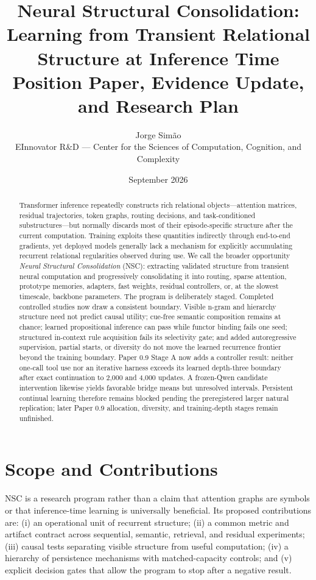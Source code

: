 \documentclass[11pt]{article}
\title{Neural Structural Consolidation:\\Learning from Transient Relational Structure at Inference Time\\\large Position Paper, Evidence Update, and Research Plan}
\author{Jorge Sim\~ao\\EInnovator R\&D --- Center for the Sciences of Computation, Cognition, and Complexity}\date{September 2026}
\begin{document}
\maketitle
\begin{abstract}
Transformer inference repeatedly constructs rich relational objects---attention matrices, residual trajectories, token graphs, routing decisions, and task-conditioned substructures---but normally discards most of their episode-specific structure after the current computation. Training exploits these quantities indirectly through end-to-end gradients, yet deployed models generally lack a mechanism for explicitly accumulating recurrent relational regularities observed during use. We call the broader opportunity \emph{Neural Structural Consolidation} (NSC): extracting validated structure from transient neural computation and progressively consolidating it into routing, sparse attention, prototype memories, adapters, fast weights, residual controllers, or, at the slowest timescale, backbone parameters. The program is deliberately staged. Completed controlled studies now draw a consistent boundary. Visible n-gram and hierarchy structure need not predict causal utility; cue-free semantic composition remains at chance; learned propositional inference can pass while functor binding fails one seed; structured in-context rule acquisition fails its selectivity gate; and added autoregressive supervision, partial starts, or diversity do not move the learned recurrence frontier beyond the training boundary. Paper 0.9 Stage A now adds a controller result: neither one-call tool use nor an iterative harness exceeds its learned depth-three boundary after exact continuation to 2,000 and 4,000 updates. A frozen-Qwen candidate intervention likewise yields favorable bridge means but unresolved intervals. Persistent continual learning therefore remains blocked pending the preregistered larger natural replication; later Paper 0.9 allocation, diversity, and training-depth stages remain unfinished.
\end{abstract}
\section{Scope and Contributions}
NSC is a research program rather than a claim that attention graphs are symbols or that inference-time learning is universally beneficial. Its proposed contributions are: (i) an operational unit of recurrent structure; (ii) a common metric and artifact contract across sequential, semantic, retrieval, and residual experiments; (iii) causal tests separating visible structure from useful computation; (iv) a hierarchy of persistence mechanisms with matched-capacity controls; and (v) explicit decision gates that allow the program to stop after a negative result.
\end{document}
